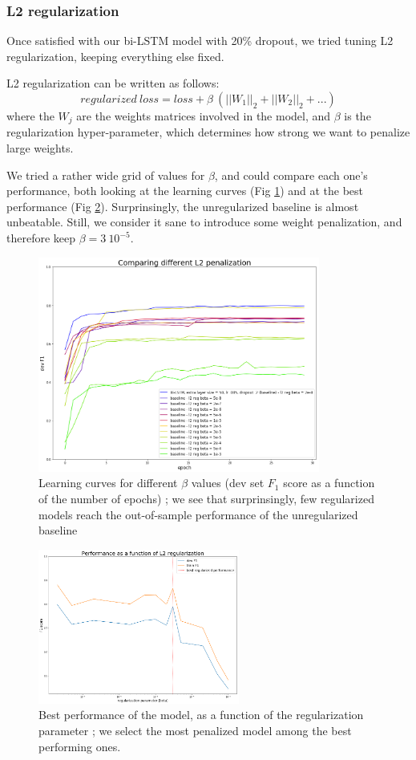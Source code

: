 \documentclass{article} %
\begin{document}
\subsubsection{L2 regularization}

Once satisfied with our bi-LSTM model with 20\% dropout, we tried tuning L2 regularization, keeping everything else fixed.

L2 regularization can be written as follows: $$regularized~loss = loss + \beta~(||W_1||_2+||W_2||_2+...)$$ where the $W_j$ are the weights matrices involved in the model, and $\beta$ is the regularization hyper-parameter, which determines how strong we want to penalize large weights.

We tried a rather wide grid of values for $\beta$, and could compare each one's performance, both looking at the learning curves (Fig \ref{l2_devf1}) and at the best performance (Fig \ref{l2_graph}). Surprinsingly, the unregularized baseline is almost unbeatable. Still, we consider it sane to introduce some weight penalization, and therefore keep $\beta=3~10^{-5}$.


\begin{figure}[h!]
\begin{center}
\includegraphics[width=350px]{figs/l2_devf1.png}
\caption{Learning curves for different $\beta$ values (dev set $F_1$ score as a function of the number of epochs) ; we see that surprinsingly, few regularized models reach the out-of-sample performance of the unregularized baseline}
\label{l2_devf1}
\end{center}
\end{figure}

\begin{figure}[h!]
\begin{center}
\includegraphics[width=250px]{figs/l2_graph.png}
\caption{Best performance of the model, as a function of the regularization parameter ; we select the most penalized model among the best performing ones.}
\label{l2_graph}
\end{center}
\end{figure}
\end{document}
